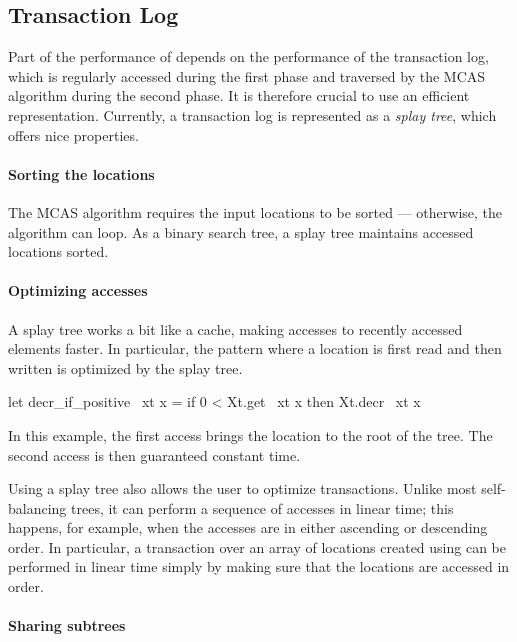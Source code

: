 \subsection{Transaction Log}
\label{sec:implementation_transaction_log}

Part of the performance of \Kcas depends on the performance of the transaction log, which is regularly accessed during the first phase and traversed by the MCAS algorithm during the second phase.
It is therefore crucial to use an efficient representation.
Currently, a transaction log is represented as a \emph{splay tree}, which offers nice properties.

\paragraph{Sorting the locations}

The MCAS algorithm requires the input locations to be sorted --- otherwise, the algorithm can loop.
As a binary search tree, a splay tree maintains accessed locations sorted.

\paragraph{Optimizing accesses}

A splay tree works a bit like a cache, making accesses to recently accessed elements faster.
In particular, the pattern where a location is first read and then written is optimized by the splay tree.
\begin{ocamlcode}
let decr_if_positive ~xt x =
  if 0 < Xt.get ~xt x then Xt.decr ~xt x
\end{ocamlcode}
In this example, the first access brings the location to the root of the tree.
The second access is then guaranteed constant time.

Using a splay tree also allows the user to optimize transactions.
Unlike most self-balancing trees, it can perform a sequence of accesses in linear time; this happens, for example, when the accesses are in either ascending or descending order.
In particular, a transaction over an array of locations created using  can be performed in linear time simply by making sure that the locations are accessed in order.

\paragraph{Sharing subtrees}

